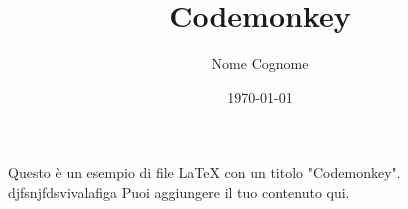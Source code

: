 \documentclass{article}
\title{Codemonkey}
\author{Nome Cognome}
\date{\today}
\begin{document}
\maketitle

Questo è un esempio di file LaTeX con un titolo "Codemonkey".
djfsnjfdsvivalafiga Puoi aggiungere il tuo contenuto qui.
\end{document}
